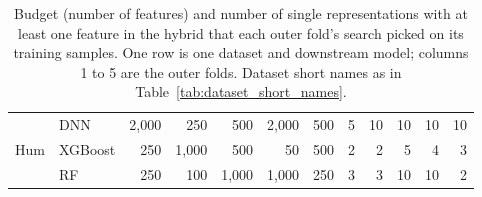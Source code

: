 \begin{table}[htbp]
\begin{tabular}{@{}llrrrrrrrrrr@{}}
 & DNN & 2{,}000 & 250 & 500 & 2{,}000 & 500 & 5 & 10 & 10 & 10 & 10 \\
Hum & XGBoost & 250 & 1{,}000 & 500 & 50 & 500 & 2 & 2 & 5 & 4 & 3 \\
 & RF & 250 & 100 & 1{,}000 & 1{,}000 & 250 & 3 & 3 & 10 & 10 & 2 \\
\bottomrule
\end{tabular}
\caption[Budget and number of representations each fold picked.]{Budget (number of features) and number of single representations with at least one feature in the hybrid that each outer fold's search picked on its training samples. One row is one dataset and downstream model; columns 1 to 5 are the outer folds. Dataset short names as in Table~\ref{tab:dataset_short_names}.}
\label{tab:method:budget_per_fold}
\end{table}

